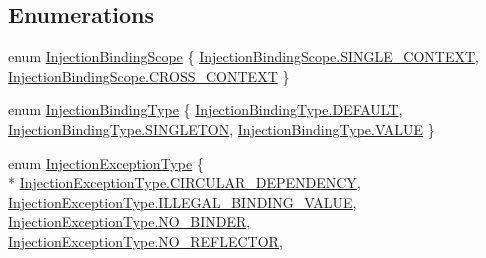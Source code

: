 \subsection*{Enumerations}
\begin{DoxyCompactItemize}
\item 
enum \hyperlink{namespacestrange_1_1extensions_1_1injector_1_1api_ab0f6d151014ae36671ff9f98e77fbf58}{Injection\-Binding\-Scope} \{ \hyperlink{namespacestrange_1_1extensions_1_1injector_1_1api_ab0f6d151014ae36671ff9f98e77fbf58a5efb0d7efb9ed38fdfc18f50c75570a4}{Injection\-Binding\-Scope.\-S\-I\-N\-G\-L\-E\-\_\-\-C\-O\-N\-T\-E\-X\-T}, 
\hyperlink{namespacestrange_1_1extensions_1_1injector_1_1api_ab0f6d151014ae36671ff9f98e77fbf58a6c804354e5821aaa248a65dd6b80cd54}{Injection\-Binding\-Scope.\-C\-R\-O\-S\-S\-\_\-\-C\-O\-N\-T\-E\-X\-T}
 \}
\item 
enum \hyperlink{namespacestrange_1_1extensions_1_1injector_1_1api_aaf5414484d7eccb5c502984bd70549ae}{Injection\-Binding\-Type} \{ \hyperlink{namespacestrange_1_1extensions_1_1injector_1_1api_aaf5414484d7eccb5c502984bd70549aea5b39c8b553c821e7cddc6da64b5bd2ee}{Injection\-Binding\-Type.\-D\-E\-F\-A\-U\-L\-T}, 
\hyperlink{namespacestrange_1_1extensions_1_1injector_1_1api_aaf5414484d7eccb5c502984bd70549aeaecf2a6aabcb0538532ba2a7d0d281557}{Injection\-Binding\-Type.\-S\-I\-N\-G\-L\-E\-T\-O\-N}, 
\hyperlink{namespacestrange_1_1extensions_1_1injector_1_1api_aaf5414484d7eccb5c502984bd70549aeaecc2e9c313faddb07e7da223c1dc5c3f}{Injection\-Binding\-Type.\-V\-A\-L\-U\-E}
 \}
\item 
enum \hyperlink{namespacestrange_1_1extensions_1_1injector_1_1api_a465caee64cba80e952ad7dd9a050e6c3}{Injection\-Exception\-Type} \{ \\*
\hyperlink{namespacestrange_1_1extensions_1_1injector_1_1api_a465caee64cba80e952ad7dd9a050e6c3a79b274c6abdd5dbdee1fc57599e4199b}{Injection\-Exception\-Type.\-C\-I\-R\-C\-U\-L\-A\-R\-\_\-\-D\-E\-P\-E\-N\-D\-E\-N\-C\-Y}, 
\hyperlink{namespacestrange_1_1extensions_1_1injector_1_1api_a465caee64cba80e952ad7dd9a050e6c3a6b2a4399cd12f799fcb9d3f9bd547a44}{Injection\-Exception\-Type.\-I\-L\-L\-E\-G\-A\-L\-\_\-\-B\-I\-N\-D\-I\-N\-G\-\_\-\-V\-A\-L\-U\-E}, 
\hyperlink{namespacestrange_1_1extensions_1_1injector_1_1api_a465caee64cba80e952ad7dd9a050e6c3aa2e9be06fffa1381cd8334d9573dbb1f}{Injection\-Exception\-Type.\-N\-O\-\_\-\-B\-I\-N\-D\-E\-R}, 
\hyperlink{namespacestrange_1_1extensions_1_1injector_1_1api_a465caee64cba80e952ad7dd9a050e6c3a3dad242c36c44d758a7e045c2be3b2ad}{Injection\-Exception\-Type.\-N\-O\-\_\-\-R\-E\-F\-L\-E\-C\-T\-O\-R}, 

\end{DoxyCompactItemize}
